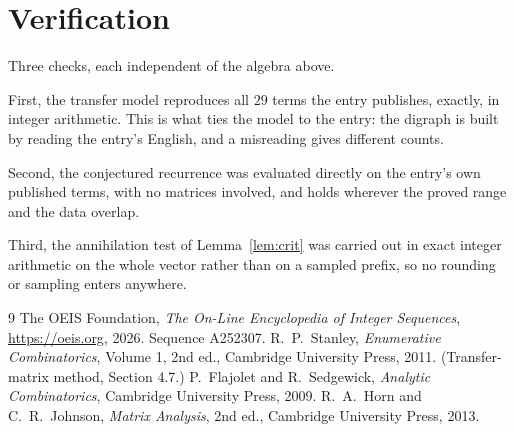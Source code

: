 \documentclass[11pt,a4paper]{article}
\theoremstyle{plain}
\theoremstyle{definition}
\begin{document}
\section{Verification}

Three checks, each independent of the algebra above.

First, the transfer model reproduces all $29$ terms the entry publishes, exactly, in
integer arithmetic. This is what ties the model to the entry: the digraph is built by reading
the entry's English, and a misreading gives different counts.

Second, the conjectured recurrence was evaluated directly on the entry's own published terms,
with no matrices involved, and holds wherever the proved range and the data overlap.

Third, the annihilation test of Lemma~\ref{lem:crit} was carried out in exact integer
arithmetic on the whole vector rather than on a sampled prefix, so no rounding or sampling
enters anywhere.

\begin{thebibliography}{9}
 The OEIS Foundation, \emph{The On-Line Encyclopedia of Integer
Sequences}, \url{https://oeis.org}, 2026. Sequence A252307.
 R.~P.~Stanley, \emph{Enumerative Combinatorics}, Volume 1, 2nd ed.,
Cambridge University Press, 2011. (Transfer-matrix method, Section 4.7.)
 P.~Flajolet and R.~Sedgewick, \emph{Analytic Combinatorics}, Cambridge
University Press, 2009.
 R.~A.~Horn and C.~R.~Johnson, \emph{Matrix Analysis}, 2nd ed., Cambridge
University Press, 2013.
\end{thebibliography}
\end{document}
